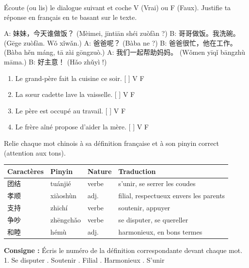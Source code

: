 \documentclass[11pt]{article}
\begin{document}
\begin{exercice}
Écoute (ou lis) le dialogue suivant et coche V (Vrai) ou F (Faux). Justifie ta réponse en français en te basant sur le texte.

\begin{textebox}
A: 妹妹，今天谁做饭？ (Mèimei, jīntiān shéi zuòfàn ?)
B: 哥哥做饭。我洗碗。 (Gēge zuòfàn. Wǒ xǐwǎn.)
A: 爸爸呢？ (Bàba ne ?)
B: 爸爸很忙，他在工作。 (Bàba hěn máng, tā zài gōngzuò.)
A: 我们一起帮助妈妈。 (Wǒmen yīqǐ bāngzhù māma.)
B: 好主意！ (Hǎo zhǔyì !)
\end{textebox}

\begin{enumerate}
    \item Le grand-père fait la cuisine ce soir. \hfill [ ] V \quad [ ] F
    \item La sœur cadette lave la vaisselle. \hfill [ ] V \quad [ ] F
    \item Le père est occupé au travail. \hfill [ ] V \quad [ ] F
    \item Le frère aîné propose d'aider la mère. \hfill [ ] V \quad [ ] F
\end{enumerate}
\end{exercice}

\begin{exercice}
Relie chaque mot chinois à sa définition française et à son pinyin correct (attention aux tons).

\begin{center}
\begin{tabularx}{\linewidth}{|X|X|X|X|}
\hline
\rowcolor{popblueL} \textbf{Caractères} & \textbf{Pinyin} & \textbf{Nature} & \textbf{Traduction} \\
\hline
团结 & tuánjié & verbe & s'unir, se serrer les coudes \\
\hline
孝顺 & xiàoshùn & adj. & filial, respectueux envers les parents \\
\hline
支持 & zhīchí & verbe & soutenir, appuyer \\
\hline
争吵 & zhēngchǎo & verbe & se disputer, se quereller \\
\hline
和睦 & hémù & adj. & harmonieux, en bons termes \\
\hline
\end{tabularx}
\end{center}

\textbf{Consigne :} Écris le numéro de la définition correspondante devant chaque mot.
1. Se disputer . Soutenir . Filial . Harmonieux . S'unir
\end{exercice}
\end{document}
